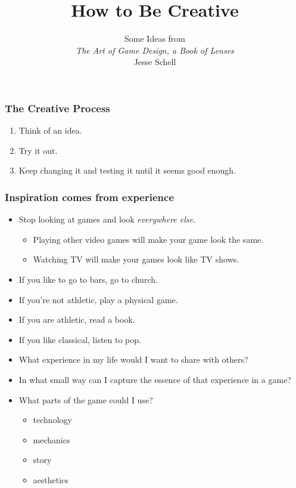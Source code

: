 \documentclass{beamer}
\title{How to Be Creative}
\subtitle{Some Ideas from\\ {\em The Art of Game Design, a
  Book of Lenses}\\ Jesse Schell}
\begin{document}
\begin{frame}[plain]
  \titlepage
\end{frame}

\begin{frame}
  \frametitle{The Creative Process}


\begin{enumerate}
\item Think of an idea.
\item Try it out.
\item Keep changing it and testing it until it seems good enough.
\end{enumerate}

\end{frame}
\begin{frame}
  \frametitle{Inspiration comes from experience}

\begin{itemize}
\item Stop looking at games and look {\em everywhere else.}\pause
\begin{itemize}
\item Playing other video games will make your game look the same.\pause
\item Watching TV will make your games look like TV shows.\pause
\end{itemize}
\item If you like to go to bars, go to church.\pause
\item If you're not athletic, play a physical game.\pause
\item If you are athletic, read a book.\pause
\item If you like classical, listen to pop.\pause
\item What experience in my life would I want to share with
  others?\pause
\item In what small way can I capture the essence of that experience
  in a game?\pause
\item What parts of the game could I use?
\begin{itemize}\item technology\item mechanics\item story\item aesthetics
\end{itemize}

\end{itemize}

\end{frame}
\end{document}
